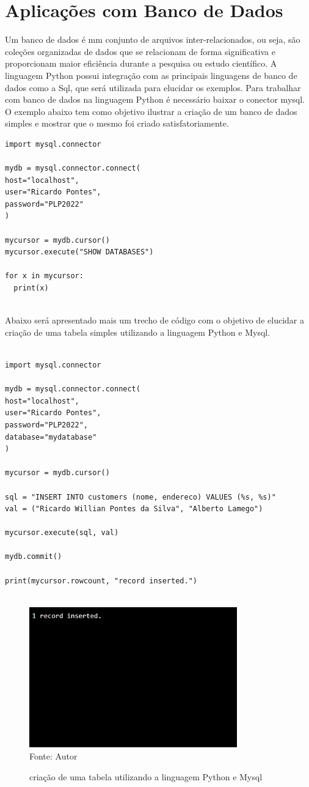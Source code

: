    \section{Aplica\c{c}\~{o}es com Banco de Dados}
Um banco de dados é mm conjunto de arquivos inter-relacionados, ou seja, são coleções organizadas de dados que se relacionam de forma significativa e proporcionam maior eficiência durante a pesquisa ou estudo científico. A linguagem Python possui integração com as principais linguagens de banco de dados como a Sql, que será utilizada para elucidar os exemplos. Para trabalhar com banco de dados na linguagem Python é necessário baixar o conector mysql. O exemplo abaixo tem como objetivo ilustrar a criação de um banco de dados simples e mostrar que o mesmo foi criado satisfatoriamente.

\begin{lstlisting}
import mysql.connector
	
mydb = mysql.connector.connect(
host="localhost",
user="Ricardo Pontes",
password="PLP2022"
)

mycursor = mydb.cursor()
mycursor.execute("SHOW DATABASES")
	
for x in mycursor:
  print(x)
	
\end{lstlisting}

Abaixo será apresentado mais um trecho de código com o objetivo de elucidar a criação de uma tabela simples utilizando a linguagem Python e Mysql.

\begin{lstlisting}

import mysql.connector

mydb = mysql.connector.connect(
host="localhost",
user="Ricardo Pontes",
password="PLP2022",
database="mydatabase"
)

mycursor = mydb.cursor()

sql = "INSERT INTO customers (nome, endereco) VALUES (%s, %s)"
val = ("Ricardo Willian Pontes da Silva", "Alberto Lamego")

mycursor.execute(sql, val)

mydb.commit()

print(mycursor.rowcount, "record inserted.")
	
\end{lstlisting}

 \begin{figure}[H]
	\begin{center}
		\caption{criação de uma tabela utilizando a linguagem Python e Mysql} \label{ling1}
		\includegraphics[width=9cm]{database.PNG} \\
		{\tiny \sf Fonte:{ Autor}}
	\end{center}
\end{figure}
